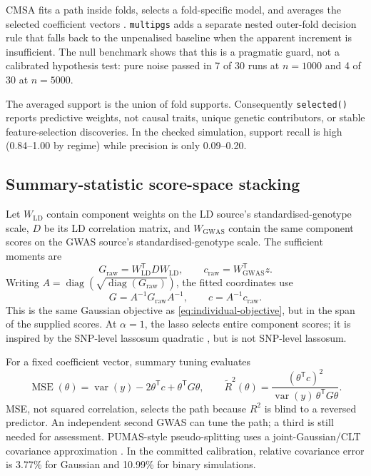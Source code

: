 \documentclass[10pt,a4paper]{article}
\newcommand{\pkg}[1]{\texttt{#1}}
\newcommand{\code}[1]{\texttt{#1}}
\newcommand{\Rtwo}{\(R^2\)}
\begin{document}
CMSA fits a path inside folds, selects a fold-specific model, and averages the
selected coefficient vectors \cite{prive2019}. \pkg{multipgs} adds a separate
nested outer-fold decision rule that falls back to the unpenalised baseline
when the apparent increment is insufficient. The null benchmark shows that
this is a pragmatic guard, not a calibrated hypothesis test: pure noise passed
in 7 of 30 runs at \(n=1000\) and 4 of 30 at \(n=5000\).

The averaged support is the union of fold supports. Consequently
\code{selected()} reports predictive weights, not causal traits, unique genetic
contributors, or stable feature-selection discoveries. In the checked
simulation, support recall is high (0.84--1.00 by regime) while precision is
only 0.09--0.20.

\subsection{Summary-statistic score-space stacking}

Let \(W_{\mathrm{LD}}\) contain component weights on the LD source's
standardised-genotype scale, \(D\) be its LD correlation matrix, and
\(W_{\mathrm{GWAS}}\) contain the same component scores on the GWAS source's
standardised-genotype scale. The sufficient moments are
\begin{equation}
  G_{\mathrm{raw}}=
    W_{\mathrm{LD}}^{\mathsf T} D W_{\mathrm{LD}},
  \qquad
  c_{\mathrm{raw}}=
    W_{\mathrm{GWAS}}^{\mathsf T}z .
  \label{eq:score-moments}
\end{equation}
Writing \(A=\operatorname{diag}
(\sqrt{\operatorname{diag}(G_{\mathrm{raw}})})\), the fitted coordinates use
\begin{equation}
  G=A^{-1}G_{\mathrm{raw}}A^{-1},
  \qquad
  c=A^{-1}c_{\mathrm{raw}} .
  \label{eq:standardized-moments}
\end{equation}
This is the same Gaussian objective as \cref{eq:individual-objective}, but in
the span of the supplied scores. At \(\alpha=1\), the lasso selects entire
component scores; it is inspired by the SNP-level lassosum quadratic
\cite{mak2017}, but is not SNP-level lassosum.

For a fixed coefficient vector, summary tuning evaluates
\begin{equation}
  \operatorname{MSE}(\theta)
    =\operatorname{var}(y)-2\theta^{\mathsf T}c
      +\theta^{\mathsf T}G\theta,
  \qquad
  \widetilde R^2(\theta)
    =\frac{(\theta^{\mathsf T}c)^2}
    {\operatorname{var}(y)\,\theta^{\mathsf T}G\theta}.
  \label{eq:summary-metrics}
\end{equation}
MSE, not squared correlation, selects the path because \Rtwo{} is blind to a
reversed predictor. An independent second GWAS can tune the path; a third is
still needed for assessment. PUMAS-style pseudo-splitting uses a
joint-Gaussian/CLT covariance approximation \cite{zhao2021}. In the committed
calibration, relative covariance error is 3.77\% for Gaussian and 10.99\% for
binary simulations.
\end{document}
